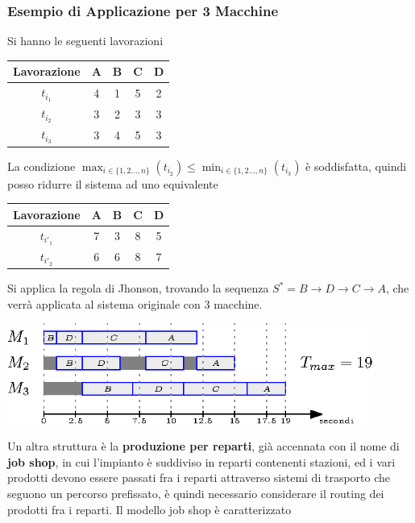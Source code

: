 \documentclass[10pt, letterpaper]{report}
\begin{document}
\subsubsection{Esempio di Applicazione per 3 Macchine}
Si hanno le seguenti lavorazioni \begin{center}
    \begin{tabular}{|c|c|c|c|c|}
        \hline
        Lavorazione & A & B & C & D \\ \hline
        $t_{i_1}$   & 4 & 1 & 5 & 2 \\ \hline
        $t_{i_2}$   & 3 & 2 & 3 & 3 \\ \hline
        $t_{i_3}$   & 3 & 4 & 5 & 3 \\ \hline
        \end{tabular}
\end{center}
La condizione $\max_{i\in\{1,2\dots ,n\}}(t_{i_2}) \le \min_{i\in\{1,2\dots ,n\}}(t_{i_3}) $ è soddisfatta, 
quindi posso ridurre il sistema ad uno equivalente \begin{center}
    \begin{tabular}{|c|c|c|c|c|}
        \hline
        Lavorazione & A & B & C & D \\ \hline
        $t_{i'_1}$   & 7 & 3 & 8 & 5 \\ \hline
        $t_{i'_2}$   & 6 & 6 & 8 & 7 \\ \hline
        \end{tabular}
\end{center}
Si applica la regola di Jhonson, trovando la sequenza $S^*=B\rightarrow D\rightarrow C\rightarrow A$, che verrà 
applicata al sistema originale con 3 macchine.\begin{center}
    \includegraphics[width=0.9\textwidth ]{images/jhonson2.eps}
\end{center}
Un altra struttura è la \textbf{produzione per reparti}, già accennata con il nome di \textbf{job shop},
in cui l'impianto è suddiviso in reparti contenenti stazioni, ed i vari prodotti devono essere passati fra i 
reparti attraverso sistemi di trasporto che seguono un percorso 
prefissato, è quindi necessario considerare il routing dei prodotti fra i reparti. Il modello job shop è caratterizzato 
\end{document}
